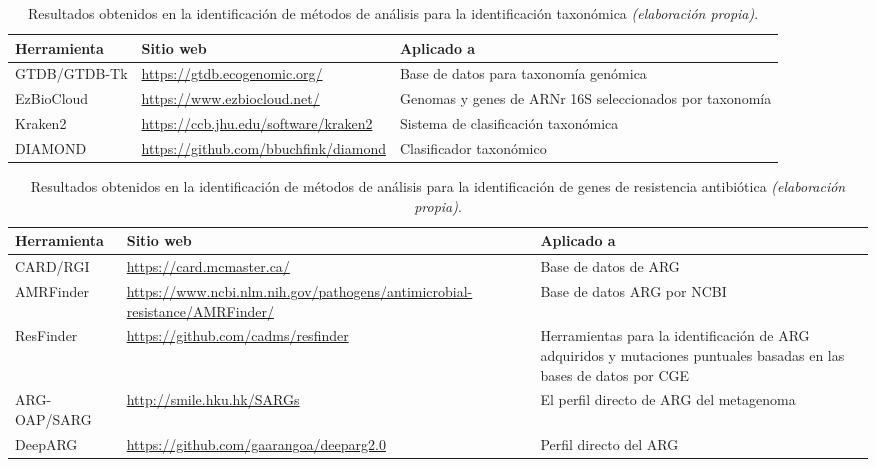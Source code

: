 \documentclass[12pt]{article}
\begin{document}
\newpage 
\begin{table}[htbp]
    \centering
    \caption{Resultados obtenidos en la identificación de métodos de análisis para la identificación taxonómica \emph{(elaboración propia)}.}
    \label{tabla:identificacion_taxonomica}
    \begin{tabularx}{\textwidth}{|p{3cm}|X|X|}
        \hline
        \textbf{Herramienta} & \textbf{Sitio web} & \textbf{Aplicado a} \\
        \hline
        GTDB/GTDB-Tk & \href{https://gtdb.ecogenomic.org/}{\url{https://gtdb.ecogenomic.org/}} & Base de datos para taxonomía genómica \\
        \hline
        EzBioCloud & \href{https://www.ezbiocloud.net/}{\url{https://www.ezbiocloud.net/}} & Genomas y genes de ARNr 16S seleccionados por taxonomía \\
        \hline
        Kraken2 & \href{https://ccb.jhu.edu/software/kraken2}{\url{https://ccb.jhu.edu/software/kraken2}} & Sistema de clasificación taxonómica \\
        \hline
        DIAMOND & \href{https://github.com/bbuchfink/diamond}{\url{https://github.com/bbuchfink/diamond}} & Clasificador taxonómico \\
        \hline
    \end{tabularx}
\end{table}

\begin{table}[htbp]
    \centering
    \caption{Resultados obtenidos en la identificación de métodos de análisis para la identificación de genes de resistencia antibiótica \emph{(elaboración propia)}.}
    \label{tabla:resistencia_antibiotica}
    \begin{tabularx}{\textwidth}{|p{3cm}|X|X|}
        \hline
        \textbf{Herramienta} & \textbf{Sitio web} & \textbf{Aplicado a} \\
        \hline
        CARD/RGI & \href{https://card.mcmaster.ca/}{\url{https://card.mcmaster.ca/}} & Base de datos de ARG \\
        \hline
        AMRFinder & \href{https://www.ncbi.nlm.nih.gov/pathogens/antimicrobial-resistance/AMRFinder/}{\url{https://www.ncbi.nlm.nih.gov/pathogens/antimicrobial-resistance/AMRFinder/}} & Base de datos ARG por NCBI \\
        \hline
        ResFinder & \href{https://github.com/cadms/resfinder}{\url{https://github.com/cadms/resfinder}} & Herramientas para la identificación de ARG adquiridos y mutaciones puntuales basadas en las bases de datos por CGE \\
        \hline
        ARG-OAP/SARG & \href{http://smile.hku.hk/SARGs}{\url{http://smile.hku.hk/SARGs}} & El perfil directo de ARG del metagenoma \\
        \hline
        DeepARG & \href{https://github.com/gaarangoa/deeparg2.0}{\url{https://github.com/gaarangoa/deeparg2.0}} & Perfil directo del ARG \\
        \hline
    \end{tabularx}
\end{table}
\end{document}
